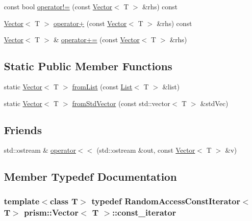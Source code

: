 \begin{DoxyCompactItemize}
\item 
const bool \hyperlink{classprism_1_1_vector_a7f3b55afc7268eba0f06a16f54b66b0c}{operator!=} (const \hyperlink{classprism_1_1_vector}{Vector}$<$ T $>$ \&rhs) const 
\item 
\hyperlink{classprism_1_1_vector}{Vector}$<$ T $>$ \hyperlink{classprism_1_1_vector_a9275846b38b6ce971d7d7114bca5acc2}{operator+} (const \hyperlink{classprism_1_1_vector}{Vector}$<$ T $>$ \&rhs) const 
\item 
\hyperlink{classprism_1_1_vector}{Vector}$<$ T $>$ \& \hyperlink{classprism_1_1_vector_a094f14b6f6f219dda41b0b7879d9b6b5}{operator+=} (const \hyperlink{classprism_1_1_vector}{Vector}$<$ T $>$ \&rhs)
\end{DoxyCompactItemize}
\subsection*{Static Public Member Functions}
\begin{DoxyCompactItemize}
\item 
static \hyperlink{classprism_1_1_vector}{Vector}$<$ T $>$ \hyperlink{classprism_1_1_vector_a66de66a61b4577aa20f6a6f5e4b8e99d}{from\+List} (const \hyperlink{classprism_1_1_list}{List}$<$ T $>$ \&list)
\item 
static \hyperlink{classprism_1_1_vector}{Vector}$<$ T $>$ \hyperlink{classprism_1_1_vector_ac947685add7d54b025a471b59445fc6a}{from\+Std\+Vector} (const std\+::vector$<$ T $>$ \&std\+Vec)
\end{DoxyCompactItemize}
\subsection*{Friends}
\begin{DoxyCompactItemize}
\item 
std\+::ostream \& \hyperlink{classprism_1_1_vector_adea1a7e2e26629669d11a49d8899a1ec}{operator$<$$<$} (std\+::ostream \&out, const \hyperlink{classprism_1_1_vector}{Vector}$<$ T $>$ \&v)
\end{DoxyCompactItemize}


\subsection{Member Typedef Documentation}
\subsubsection[{\texorpdfstring{const\+\_\+iterator}{const_iterator}}]{\setlength{\rightskip}{0pt plus 5cm}template$<$class T$>$ typedef Random\+Access\+Const\+Iterator$<$T$>$ {\bf prism\+::\+Vector}$<$ T $>$\+::{\bf const\+\_\+iterator}}\hypertarget{classprism_1_1_vector_acc6ed07e2d7ed5065feec92a83e46fa4}{}\label{classprism_1_1_vector_acc6ed07e2d7ed5065feec92a83e46fa4}
